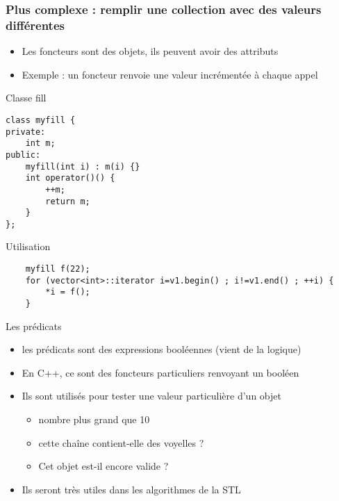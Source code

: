 \begin{frame}[fragile]\frametitle{Plus complexe : remplir une collection avec des valeurs différentes}
\begin{itemize}
\item Les foncteurs sont des objets, ils peuvent avoir des attributs
\item Exemple : un foncteur renvoie une valeur incrémentée à chaque appel
\end{itemize}
\begin{codeblock}{Classe fill}
\begin{lstlisting}
class myfill {
private:
    int m;
public:
    myfill(int i) : m(i) {}
    int operator()() {
        ++m;
        return m;
    }
};
\end{lstlisting}
\end{codeblock}
\begin{codeblock}{Utilisation}
\begin{lstlisting}
    myfill f(22);
    for (vector<int>::iterator i=v1.begin() ; i!=v1.end() ; ++i) {
        *i = f();
    }
\end{lstlisting}
\end{codeblock}
\end{frame}

\begin{frame}{Les prédicats}

\begin{itemize}
\itemsep1pt\parskip0pt
\item
  les prédicats sont des expressions booléennes (vient de la logique)
\item
  En C++, ce sont des foncteurs particuliers renvoyant un booléen
\item
  Ils sont utilisés pour tester une valeur particulière d'un objet

  \begin{itemize}
  \itemsep1pt\parskip0pt
  \item
    nombre plus grand que 10
  \item
    cette chaîne contient-elle des voyelles ?
  \item
    Cet objet est-il encore valide ?
  \end{itemize}
\item
  Ils seront très utiles dans les algorithmes de la STL
\end{itemize}

\end{frame}

